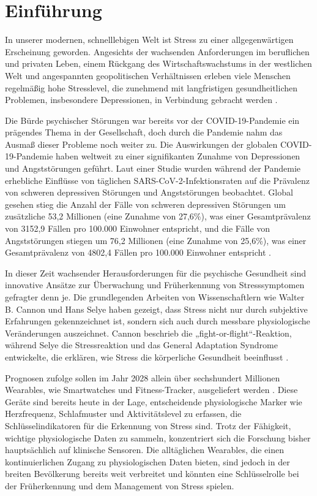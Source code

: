 \section{Einführung}

In unserer modernen, schnelllebigen Welt ist Stress zu einer allgegenwärtigen Erscheinung geworden. Angesichts der wachsenden Anforderungen im beruflichen und privaten Leben, einem Rückgang des Wirtschaftswachstums in der westlichen Welt und angespannten geopolitischen Verhältnissen erleben viele Menschen regelmäßig hohe Stresslevel, die zunehmend mit langfristigen gesundheitlichen Problemen, insbesondere Depressionen, in Verbindung gebracht werden \cite{Wang2008} \cite{Wang2001}.

Die Bürde psychischer Störungen war bereits vor der COVID-19-Pandemie ein prägendes Thema in der Gesellschaft, doch durch die Pandemie nahm das Ausmaß dieser Probleme noch weiter zu. Die Auswirkungen der globalen COVID-19-Pandemie haben weltweit zu einer signifikanten Zunahme von Depressionen und Angststörungen geführt. Laut einer Studie wurden während der Pandemie erhebliche Einflüsse von täglichen SARS-CoV-2-Infektionsraten auf die Prävalenz von schweren depressiven Störungen und Angststörungen beobachtet. Global gesehen stieg die Anzahl der Fälle von schweren depressiven Störungen um zusätzliche 53,2 Millionen (eine Zunahme von 27,6\%), was einer Gesamtprävalenz von 3152,9 Fällen pro 100.000 Einwohner entspricht, und die Fälle von Angststörungen stiegen um 76,2 Millionen (eine Zunahme von 25,6\%), was einer Gesamtprävalenz von 4802,4 Fällen pro 100.000 Einwohner entspricht \cite{Santomauro2021}.

In dieser Zeit wachsender Herausforderungen für die psychische Gesundheit sind innovative Ansätze zur Überwachung und Früherkennung von Stresssymptomen gefragter denn je. Die grundlegenden Arbeiten von Wissenschaftlern wie Walter B. Cannon und Hans Selye haben gezeigt, dass Stress nicht nur durch subjektive Erfahrungen gekennzeichnet ist, sondern sich auch durch messbare physiologische Veränderungen auszeichnet. Cannon beschrieb die „fight-or-flight“-Reaktion, während Selye die Stressreaktion und das General Adaptation Syndrome entwickelte, die erklären, wie Stress die körperliche Gesundheit beeinflusst \cite{Cannon1915} \cite{Selye1936}.

Prognosen zufolge sollen im Jahr 2028 allein über sechshundert Millionen Wearables, wie Smartwatches und Fitness-Tracker, ausgeliefert werden \cite{IDC2023}. Diese Geräte sind bereits heute in der Lage, entscheidende physiologische Marker wie Herzfrequenz, Schlafmuster und Aktivitätslevel zu erfassen, die Schlüsselindikatoren für die Erkennung von Stress sind. Trotz der Fähigkeit, wichtige physiologische Daten zu sammeln, konzentriert sich die Forschung bisher hauptsächlich auf klinische Sensoren. Die alltäglichen Wearables, die einen kontinuierlichen Zugang zu physiologischen Daten bieten, sind jedoch in der breiten Bevölkerung bereits weit verbreitet und könnten eine Schlüsselrolle bei der Früherkennung und dem Management von Stress spielen.


